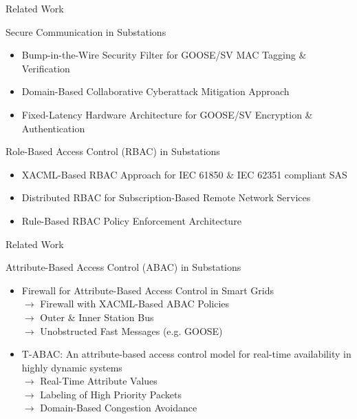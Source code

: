 \documentclass[en]{sdqbeamer}
\begin{document}
\begin{frame}{Related Work}
    \begin{blueblock}{Secure Communication in Substations}
        \begin{itemize}
            \item Bump-in-the-Wire Security Filter for GOOSE/SV MAC Tagging \& Verification \parencite{Ishchenko2018}
            \item Domain-Based Collaborative Cyberattack Mitigation Approach \parencite{Hong2019}
            \item Fixed-Latency Hardware Architecture for GOOSE/SV Encryption \& Authentication \parencite{Rodriguez2021}
        \end{itemize}
    \end{blueblock}

    \begin{blueblock}{Role-Based Access Control (RBAC) in Substations}
        \begin{itemize}
            \item XACML-Based RBAC Approach for IEC 61850 \& IEC 62351 compliant SAS \parencite{Lee2015}
            \item Distributed RBAC for Subscription-Based Remote Network Services \parencite{Ma2006} %
            \item Rule-Based RBAC Policy Enforcement Architecture \parencite{Alcaraz2016} %
        \end{itemize}
    \end{blueblock}
\end{frame}
\begin{frame}{Related Work}
    \begin{blueblock}{Attribute-Based Access Control (ABAC) in Substations}
        \begin{itemize}
            \item Firewall for Attribute-Based Access Control in Smart Grids \parencite{Ruland2018}
            \\$\rightarrow$ Firewall with XACML-Based ABAC Policies
            \\$\rightarrow$ Outer \& Inner Station Bus
            \\$\rightarrow$ Unobstructed Fast Messages (e.g. GOOSE)
            \item T-ABAC: An attribute-based access control model for real-time availability in highly dynamic systems \parencite{Burmester2013}
            \\$\rightarrow$ Real-Time Attribute Values
            \\$\rightarrow$ Labeling of High Priority Packets
            \\$\rightarrow$ Domain-Based Congestion Avoidance
        \end{itemize}
    \end{blueblock}
\end{frame}
\end{document}
